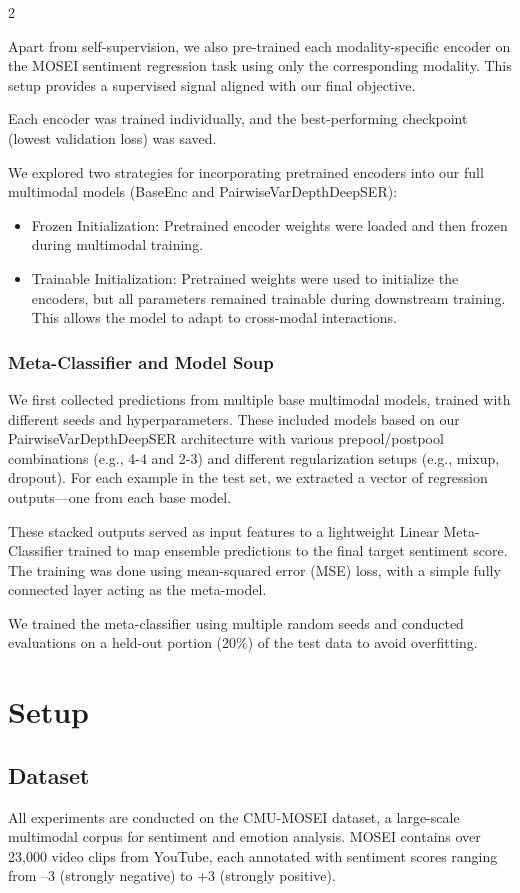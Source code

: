 \documentclass[10pt]{article}
\begin{document}
\begin{multicols}{2}
\par Apart from self-supervision, we also pre-trained each modality-specific encoder on the MOSEI sentiment regression task using only the corresponding modality. This setup provides a supervised signal aligned with our final objective. 
\par Each encoder was trained individually, and the best-performing checkpoint (lowest validation loss) was saved.
\par We explored two strategies for incorporating pretrained encoders into our full multimodal models (BaseEnc and PairwiseVarDepthDeepSER):
\begin{itemize}
    \item Frozen Initialization: Pretrained encoder weights were loaded and then frozen during multimodal training.
    \item Trainable Initialization: Pretrained weights were used to initialize the encoders, but all parameters remained trainable during downstream training. This allows the model to adapt to cross-modal interactions.
\end{itemize}


\subsubsection{Meta-Classifier and Model Soup}
\par We first collected predictions from multiple base multimodal models, trained with different seeds and hyperparameters. These included models based on our PairwiseVarDepthDeepSER architecture with various prepool/postpool combinations (e.g., 4-4 and 2-3) and different regularization setups (e.g., mixup, dropout). For each example in the test set, we extracted a vector of regression outputs—one from each base model.
\par These stacked outputs served as input features to a lightweight Linear Meta-Classifier trained to map ensemble predictions to the final target sentiment score. The training was done using mean-squared error (MSE) loss, with a simple fully connected layer acting as the meta-model.
\par We trained the meta-classifier using multiple random seeds and conducted evaluations on a held-out portion (20\%) of the test data to avoid overfitting. 


\section{Setup}
\subsection{Dataset}
\par All experiments are conducted on the CMU-MOSEI dataset, a large-scale multimodal corpus for sentiment and emotion analysis. MOSEI contains over 23,000 video clips from YouTube, each annotated with sentiment scores ranging from –3 (strongly negative) to +3 (strongly positive).


\end{multicols}
\end{document}
